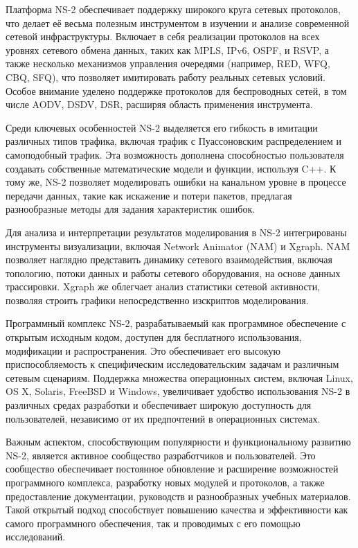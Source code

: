 Платформа NS-2 обеспечивает поддержку широкого круга сетевых протоколов, что делает её весьма полезным инструментом в изучении и анализе современной сетевой инфраструктуры. Включает в себя реализации протоколов на всех уровнях сетевого обмена данных, таких как MPLS, IPv6, OSPF, и RSVP, а также несколько механизмов управления очередями (например, RED, WFQ, CBQ, SFQ), что позволяет имитировать работу реальных сетевых условий. Особое внимание уделено поддержке протоколов для беспроводных сетей, в том числе AODV, DSDV, DSR, расширяя область применения инструмента.

Среди ключевых особенностей NS-2 выделяется его гибкость в имитации различных типов трафика, включая трафик с Пуассоновским распределением и самоподобный трафик. Эта возможность дополнена способностью пользователя создавать собственные математические модели и функции, используя C++. К тому же, NS-2 позволяет моделировать ошибки на канальном уровне в процессе передачи данных, такие как искажение и потери пакетов, предлагая разнообразные методы для задания характеристик ошибок.

Для анализа и интерпретации результатов моделирования в NS-2 интегрированы инструменты визуализации, включая Network Animator (NAM) и Xgraph. NAM позволяет наглядно представить динамику сетевого взаимодействия, включая топологию, потоки данных и работы сетевого оборудования, на основе данных трассировки. Xgraph же облегчает анализ статистики сетевой активности, позволяя строить графики непосредственно изскриптов моделирования.

Программный комплекс NS-2, разрабатываемый как программное обеспечение с открытым исходным кодом, доступен для бесплатного использования, модификации и распространения. Это обеспечивает его высокую приспособляемость к специфическим исследовательским задачам и различным сетевым сценариям. Поддержка множества операционных систем, включая Linux, OS X, Solaris, FreeBSD и Windows, увеличивает удобство использования NS-2 в различных средах разработки и обеспечивает широкую доступность для пользователей, независимо от их предпочтений в операционных системах.

Важным аспектом, способствующим популярности и функциональному развитию NS-2, является активное сообщество разработчиков и пользователей. Это сообщество обеспечивает постоянное обновление и расширение возможностей программного комплекса, разработку новых модулей и протоколов, а также предоставление документации, руководств и разнообразных учебных материалов. Такой открытый подход способствует повышению качества и эффективности как самого программного обеспечения, так и проводимых с его помощью исследований.

